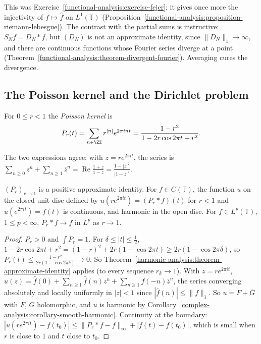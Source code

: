 This was Exercise~\ref{functional-analysis:exercise-fejer}; it gives once more the injectivity of $f \mapsto \hat f$ on $L^1(\mathbb{T})$ (Proposition~\ref{functional-analysis:proposition-riemann-lebesgue}). The contrast with the partial sums is
instructive: $S_Nf = D_N * f$, but $(D_N)$ is not an approximate identity, since $\|D_N\|_1 \to \infty$, and there are continuous functions whose Fourier series diverge at a point
(Theorem~\ref{functional-analysis:theorem-divergent-fourier}). Averaging cures the divergence.

\subsection{The Poisson kernel and the Dirichlet problem}\label{harmonic-analysis:subsection-poisson}

\begin{definition}\label{harmonic-analysis:definition-poisson-kernel}
For $0 \leq r < 1$ the \emph{Poisson kernel} is
\[
P_r(t) = \sum_{n \in \ZZ}r^{|n|}e^{2\pi int} = \frac{1 - r^2}{1 - 2r\cos 2\pi t + r^2}.
\]
\end{definition}

The two expressions agree: with $z = re^{2\pi it}$, the series is $\sum_{n \geq 0}z^n + \sum_{n \geq 1}\bar z^n = \operatorname{Re}\frac{1 + z}{1 - z} = \frac{1 - |z|^2}{|1 - z|^2}$.

\begin{theorem}\label{harmonic-analysis:theorem-dirichlet-problem}
$(P_r)_{r \to 1}$ is a positive approximate identity. For $f \in C(\mathbb{T})$, the function $u$ on the closed unit disc defined by $u(re^{2\pi it}) = (P_r * f)(t)$ for $r < 1$ and $u(e^{2\pi it}) = f(t)$ is continuous, and harmonic
in the open disc. For $f \in L^p(\mathbb{T})$, $1 \leq p < \infty$, $P_r * f \to f$ in $L^p$ as $r \to 1$.
\end{theorem}

\begin{proof}
$P_r > 0$ and $\int P_r = 1$. For $\delta \leq |t| \leq \frac12$, $1 - 2r\cos 2\pi t + r^2 = (1 - r)^2 + 2r(1 - \cos 2\pi t) \geq 2r(1 - \cos 2\pi\delta)$, so $P_r(t) \leq \frac{1 - r^2}{2r(1 - \cos 2\pi\delta)} \to 0$. So
Theorem~\ref{harmonic-analysis:theorem-approximate-identity} applies (to every sequence $r_k \to 1$). With $z = re^{2\pi it}$,
$u(z) = \hat f(0) + \sum_{n \geq 1}\hat f(n)z^n + \sum_{n \geq 1}\hat f(-n)\bar z^n$, the series converging absolutely and locally uniformly in $|z| < 1$ since $|\hat f(n)| \leq \|f\|_1$. So $u = F + \overline{G}$ with $F$, $G$
holomorphic, and $u$ is harmonic by Corollary~\ref{complex-analysis:corollary-smooth-harmonic}. Continuity at the boundary: $|u(re^{2\pi it}) - f(t_0)| \leq \|P_r * f - f\|_\infty + |f(t) - f(t_0)|$, which is small when $r$ is close
to $1$ and $t$ close to $t_0$.
\end{proof}

